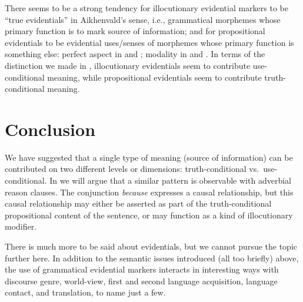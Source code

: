 There seems to be a strong tendency for illocutionary evidential markers to be “true evidentials” in Aikhenvald’s sense, i.e., grammatical morphemes whose primary function is to mark source of information; and for propositional evidentials to be evidential uses/senses of morphemes whose primary function is something else: perfect aspect in  and ; modality in  and . In terms of the distinction we made in , illocutionary evidentials seem to contribute use-conditional meaning, while propositional evidentials seem to contribute truth-conditional meaning.


\section{Conclusion}\label{sec:17.6}

We have suggested that a single type of meaning (source of information) can be contributed on two different levels or dimensions: truth-conditional vs.~use-conditional. In  we will argue that a similar pattern is observable with adverbial reason clauses. The conjunction \textit{because} expresses a causal relationship, but this causal relationship may either be asserted as part of the truth-conditional propositional content of the sentence, or may function as a kind of illocutionary modifier.



There is much more to be said about evidentials, but we cannot pursue the topic further here. In addition to the semantic issues introduced (all too briefly) above, the use of grammatical evidential markers interacts in interesting ways with discourse genre, world-view, first and second language acquisition, language contact, and translation, to name just a few.



